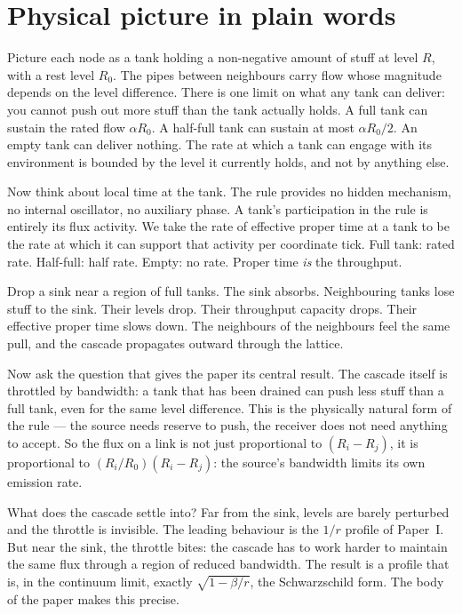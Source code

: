\documentclass[11pt,a4paper]{article}
\begin{document}
\section{Physical picture in plain words}
\label{sec:picture}

Picture each node as a tank holding a non-negative amount of
stuff at level $R$, with a rest level $R_0$. The pipes between
neighbours carry flow whose magnitude depends on the level
difference. There is one limit on what any tank can deliver:
you cannot push out more stuff than the tank actually holds.
A full tank can sustain the rated flow $\alpha R_0$. A
half-full tank can sustain at most $\alpha R_0 / 2$. An empty
tank can deliver nothing. The rate at which a tank can engage
with its environment is bounded by the level it currently
holds, and not by anything else.

Now think about local time at the tank. The rule provides no
hidden mechanism, no internal oscillator, no auxiliary phase.
A tank's participation in the rule is entirely its flux
activity. We take the rate of effective proper time at a tank
to be the rate at which it can support that activity per
coordinate tick. Full tank: rated rate. Half-full: half rate.
Empty: no rate. Proper time \emph{is} the throughput.

Drop a sink near a region of full tanks. The sink absorbs.
Neighbouring tanks lose stuff to the sink. Their levels drop.
Their throughput capacity drops. Their effective proper time
slows down. The neighbours of the neighbours feel the same
pull, and the cascade propagates outward through the lattice.

Now ask the question that gives the paper its central result.
The cascade itself is throttled by bandwidth: a tank that has
been drained can push less stuff than a full tank, even for the
same level difference. This is the physically natural form of
the rule --- the source needs reserve to push, the receiver does
not need anything to accept. So the flux on a link is not just
proportional to $(R_i - R_j)$, it is proportional to
$(R_i/R_0)(R_i - R_j)$: the source's bandwidth limits its own
emission rate.

What does the cascade settle into? Far from the sink, levels
are barely perturbed and the throttle is invisible. The leading
behaviour is the $1/r$ profile of Paper~I. But near the sink,
the throttle bites: the cascade has to work harder to maintain
the same flux through a region of reduced bandwidth. The
result is a profile that is, in the continuum limit, exactly
$\sqrt{1 - \beta/r}$, the Schwarzschild form. The body of the
paper makes this precise.
\end{document}
